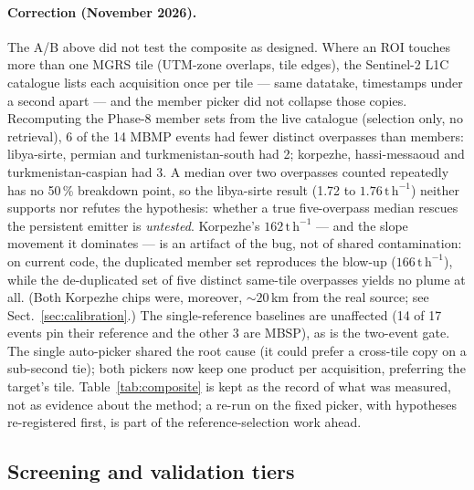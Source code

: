 \documentclass[11pt]{article}
\newcommand{\perh}{\ensuremath{\,\mathrm{t\,h^{-1}}}}
\begin{document}
\paragraph{Correction (November 2026).} The A/B above did not test the
composite as designed. Where an ROI touches more than one MGRS tile
(UTM-zone overlaps, tile edges), the Sentinel-2 L1C catalogue lists each
acquisition once per tile --- same datatake, timestamps under a second
apart --- and the member picker did not collapse those copies. Recomputing
the Phase-8 member sets from the live catalogue (selection only, no
retrieval), 6 of the 14 MBMP events had fewer distinct overpasses than
members: libya-sirte, permian and turkmenistan-south had 2; korpezhe,
hassi-messaoud and turkmenistan-caspian had 3. A median over two
overpasses counted repeatedly has no 50\,\% breakdown point, so the
libya-sirte result (1.72 to $1.76\perh$) neither supports nor refutes the
hypothesis: whether a true five-overpass median rescues the persistent
emitter is \emph{untested}. Korpezhe's $162\perh$ --- and the slope
movement it dominates --- is an artifact of the bug, not of shared
contamination: on current code, the duplicated member set reproduces the
blow-up ($166\perh$), while the de-duplicated set of five distinct
same-tile overpasses yields no plume at all. (Both Korpezhe chips were,
moreover, ${\sim}20$\,km from the real source; see
Sect.~\ref{sec:calibration}.) The
single-reference baselines are unaffected (14 of 17 events pin their
reference and the other 3 are MBSP), as is the two-event gate. The single
auto-picker shared the root cause (it could prefer a cross-tile copy on a
sub-second tie); both pickers now keep one product per acquisition,
preferring the target's tile. Table~\ref{tab:composite} is kept as the
record of what was measured, not as evidence about the method; a re-run on
the fixed picker, with hypotheses re-registered first, is part of the
reference-selection work ahead.

\subsection{Screening and validation tiers}\label{sec:tiers}
\end{document}
